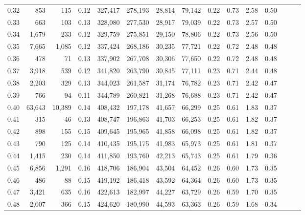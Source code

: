 \begin{tabular}{rrrrrrrrrrrrrrr}
0.32 &     853 &     115 &  0.12 &  327,417 &  278,193 &   28,814 &   79,142 &  0.22 &  0.73 &  2.58 &      0.50 \\
0.33 &     663 &     103 &  0.13 &  328,080 &  277,530 &   28,917 &   79,039 &  0.22 &  0.73 &  2.57 &      0.50 \\
0.34 &   1,679 &     233 &  0.12 &  329,759 &  275,851 &   29,150 &   78,806 &  0.22 &  0.73 &  2.56 &      0.50 \\
0.35 &   7,665 &   1,085 &  0.12 &  337,424 &  268,186 &   30,235 &   77,721 &  0.22 &  0.72 &  2.48 &      0.48 \\
0.36 &     478 &      71 &  0.13 &  337,902 &  267,708 &   30,306 &   77,650 &  0.22 &  0.72 &  2.48 &      0.48 \\
0.37 &   3,918 &     539 &  0.12 &  341,820 &  263,790 &   30,845 &   77,111 &  0.23 &  0.71 &  2.44 &      0.48 \\
0.38 &   2,203 &     329 &  0.13 &  344,023 &  261,587 &   31,174 &   76,782 &  0.23 &  0.71 &  2.42 &      0.47 \\
0.39 &     766 &      94 &  0.11 &  344,789 &  260,821 &   31,268 &   76,688 &  0.23 &  0.71 &  2.42 &      0.47 \\
0.40 &  63,643 &  10,389 &  0.14 &  408,432 &  197,178 &   41,657 &   66,299 &  0.25 &  0.61 &  1.83 &      0.37 \\
0.41 &     315 &      46 &  0.13 &  408,747 &  196,863 &   41,703 &   66,253 &  0.25 &  0.61 &  1.82 &      0.37 \\
0.42 &     898 &     155 &  0.15 &  409,645 &  195,965 &   41,858 &   66,098 &  0.25 &  0.61 &  1.82 &      0.37 \\
0.43 &     790 &     125 &  0.14 &  410,435 &  195,175 &   41,983 &   65,973 &  0.25 &  0.61 &  1.81 &      0.37 \\
0.44 &   1,415 &     230 &  0.14 &  411,850 &  193,760 &   42,213 &   65,743 &  0.25 &  0.61 &  1.79 &      0.36 \\
0.45 &   6,856 &   1,291 &  0.16 &  418,706 &  186,904 &   43,504 &   64,452 &  0.26 &  0.60 &  1.73 &      0.35 \\
0.46 &     486 &      88 &  0.15 &  419,192 &  186,418 &   43,592 &   64,364 &  0.26 &  0.60 &  1.73 &      0.35 \\
0.47 &   3,421 &     635 &  0.16 &  422,613 &  182,997 &   44,227 &   63,729 &  0.26 &  0.59 &  1.70 &      0.35 \\
0.48 &   2,007 &     366 &  0.15 &  424,620 &  180,990 &   44,593 &   63,363 &  0.26 &  0.59 &  1.68 &      0.34 \\

\end{tabular}
